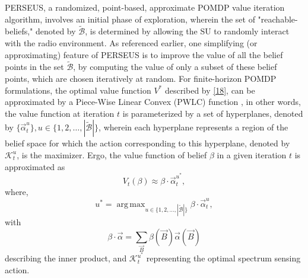 \documentclass[12pt, draftcls, onecolumn]{IEEEtran}
\DeclareMathOperator*{\argmax}{arg\,max}
\begin{document}
PERSEUS, a randomized, point-based, approximate POMDP value iteration algorithm, involves an initial phase of exploration, wherein the set of "reachable-beliefs," denoted by $\tilde{\mathcal{B}}$, is determined by allowing the SU to randomly interact with the radio environment. As referenced earlier, one simplifying (or approximating) feature of PERSEUS is to improve the value of all the belief points in the set $\tilde{\mathcal{B}}$, by computing the value of only a subset of these belief points, which are chosen iteratively at random. For finite-horizon POMDP formulations, the optimal value function $V^{*}$ described by \eqref{18}, can be approximated by a Piece-Wise Linear Convex (PWLC) function \cite{WCL:13}, in other words, the value function at iteration $t$ is parameterized by a set of hyperplanes, denoted by $\{\vec{\alpha}_{t}^{u}\},u{\in}\{1,2,\dots,|\tilde{\mathcal{B}}|\}$, wherein each hyperplane represents a region of the belief space for which the action corresponding to this hyperplane, denoted by $\mathcal{K}_{t}^{u}$, is the maximizer. Ergo, the value function of belief $\beta$ in a given iteration $t$ is approximated as
\begin{equation}\label{22}
    V_{t}(\beta) \approx \beta \cdot \vec{\alpha}_{t}^{u^{*}},
\end{equation}
where,
\begin{equation}\label{23}
    u^{*}=\argmax_{u \in \{1,2,\dots,|\tilde{\mathcal{B}}|\}}\beta \cdot \vec{\alpha}_{t}^{u},
\end{equation}
with
\begin{equation}\label{24}
    \beta \cdot \vec{\alpha}=\sum_{\vec{B}}\beta(\vec{B})\vec{\alpha}(\vec{B})
\end{equation}
describing the inner product, and $\mathcal{K}_{t}^{u^{*}}$ representing the optimal spectrum sensing action.
\end{document}
